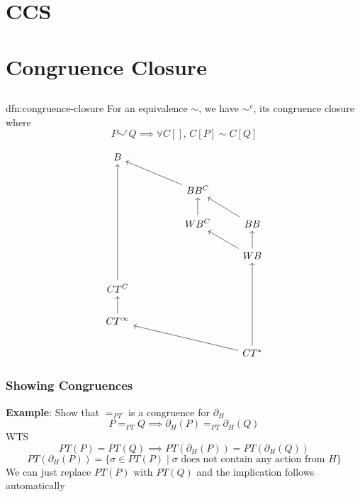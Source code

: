 \documentclass{article}
\begin{document}
\newpage
\section{CCS}

\newpage
\section{Congruence Closure}
\subsection{}

\begin{dfn}{dfn:congruence-closure}{}
    For an equivalence $\sim$, we have $\sim^{c}$, its congruence closure where
    \[P \sim^{c} Q \implies \forall C [],\, C[P] \sim C[Q]\]

\end{dfn}

\[\begin{tikzcd}
	B \\
	&& {BB^{C}} \\
	&& {WB^{C}} & BB \\
	&&& WB \\
	{CT^{C}} \\
	{CT^{\infty}} \\
	&&& {CT^{*}}
	\arrow[from=2-3, to=1-1]
	\arrow[from=3-3, to=2-3]
	\arrow[from=3-4, to=2-3]
	\arrow[from=4-4, to=3-3]
	\arrow[from=4-4, to=3-4]
	\arrow[from=5-1, to=1-1]
	\arrow[from=6-1, to=5-1]
	\arrow[from=7-4, to=4-4]
	\arrow[from=7-4, to=6-1]
\end{tikzcd}\]

\subsubsection{Showing Congruences}

\textbf{Example}: Show that $=_{PT}$ is a congruence for $\partial_{H}$
\[P =_{PT} Q \implies \partial_{H}(P) =_{PT} \partial_{H}(Q)\]
WTS
\[PT(P) = PT(Q) \implies PT(\partial_{H}(P)) = PT(\partial_{H}(Q))\]
\[PT(\partial_{H}(P)) = \{\sigma \in PT(P) \mid \text{$\sigma$ does not contain any action from $H$}\}\]
We can just replace $PT(P)$ with $PT(Q)$ and the implication follows automatically
\end{document}
